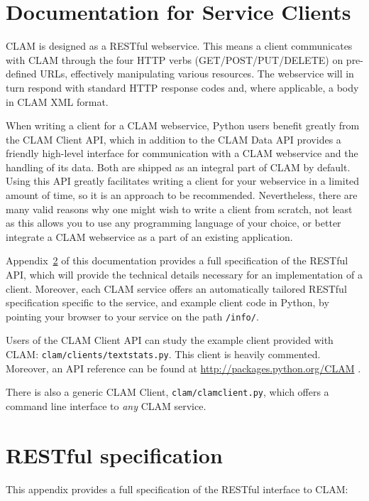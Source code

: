 \documentclass[a4paper,12pt,twoside,openright]{report}
\begin{document}
\chapter{Documentation for Service Clients}

CLAM is designed as a RESTful webservice. This means a client communicates with
CLAM through the four HTTP verbs (GET/POST/PUT/DELETE) on pre-defined URLs,
effectively manipulating various resources. The webservice will in turn respond
with standard HTTP response codes and, where applicable, a body in CLAM XML format.

When writing a client for a CLAM webservice, Python users benefit greatly from
the CLAM Client API, which in addition to the CLAM Data API provides a friendly
high-level interface for communication with a CLAM webservice and the handling
of its data. Both are shipped as an integral part of CLAM by default. Using
this API greatly facilitates writing a client for your webservice in a limited
amount of time, so it is an approach to be recommended. Nevertheless, there are
many valid reasons why one might wish to write a client from scratch, not least as
this allows you to use any programming language of your choice, or better
integrate a CLAM webservice as a part of an existing application.

Appendix~\ref{ap:restspec} of this documentation provides a full specification
of the RESTful API, which will provide the technical details necessary for an
implementation of a client. Moreover, each CLAM service offers an automatically
tailored RESTful specification specific to the service, and example client code
in Python, by pointing your browser to your service on the path
\texttt{/info/}.

Users of the CLAM Client API can study the example client provided with CLAM:
\texttt{clam/clients/textstats.py}. This client is heavily commented. Moreover,
an API reference can be found at \url{http://packages.python.org/CLAM} .

There is also a generic CLAM Client, \texttt{clam/clamclient.py}, which offers
a command line interface to \emph{any} CLAM service.

\appendix
\chapter{RESTful specification}
\label{ap:restspec}

This appendix provides a full specification of the RESTful interface to CLAM:
\end{document}
